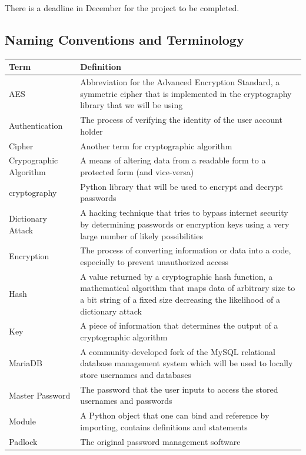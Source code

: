 \documentclass[12pt, titlepage]{article}
\begin{document}
There is a deadline in December for the project to be completed.

\subsection{Naming Conventions and Terminology}
\begin{table}
\centering
{}
\begin{tabular}{ | p{3cm} | p{10cm} | }
	\hline
	Term & Definition \\
	\hline
	AES & Abbreviation for the Advanced Encryption Standard, a symmetric cipher that is implemented in the cryptography library that we will be using \\
	\hline
	Authentication & The process of verifying the identity of the user account holder  \\
	\hline
	Cipher & Another term for cryptographic algorithm \\
	\hline
	Crypographic Algorithm & A means of altering data from a readable form to a protected form (and vice-versa) \\
	\hline
	cryptography & Python library that will be used to encrypt and decrypt passwords \\
	\hline
	Dictionary Attack & A hacking technique that tries to bypass internet security by determining passwords or encryption keys using a very large number of likely possibilities \\
	\hline
	Encryption & The process of converting information or data into a code, especially to prevent unauthorized access \\
	\hline
	Hash & A value returned by a cryptographic hash function, a mathematical algorithm that maps data of arbitrary size to a bit string of a fixed size decreasing the likelihood of a dictionary attack \\
	\hline
	Key & A piece of information that determines the output of a cryptographic algorithm \\
	\hline
	MariaDB & A community-developed fork of the MySQL relational database management system which will be used to locally store usernames and databases \\
	\hline
	Master Password & The password that the user inputs to access the stored usernames and passwords \\
	\hline
	Module & A Python object that one can bind and reference by importing, contains definitions and statements \\
	\hline
	Padlock & The original password management software \\

\end{tabular}
\end{table}
\end{document}
